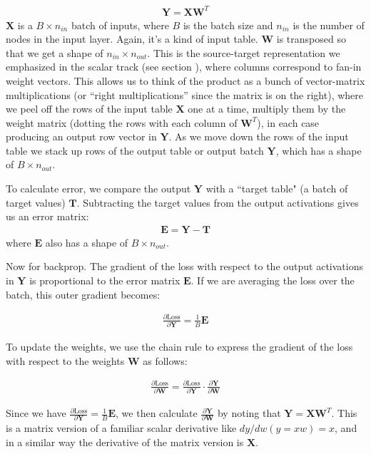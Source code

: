 \begin{eqnarray}
\mathbf{Y} = \mathbf{X} \mathbf{W}^T
\end{eqnarray}
$\mathbf{X}$ is a  $B \times n_{in}$ batch of inputs, where $B$ is the batch size and $n_{in}$ is the number of nodes in the input layer. Again, it's a kind of input table. $\mathbf{W}$ is transposed so that we get a shape of $n_{in} \times n_{out}$. This is the source-target representation we emphasized in the scalar track (see section ), where columns correspond to fan-in weight vectors. This allows us to think of the product as a bunch of vector-matrix multiplications (or ``right multiplications'' since the matrix is on the right), where we peel off the rows of the input table $\mathbf{X}$ one at a time, multiply them by the weight matrix (dotting the rows with each column of $\mathbf{W}^T$), in each case producing an output row vector in $\mathbf{Y}$. As we move down the rows of the input table we stack up rows of the output table or output batch $\mathbf{Y}$, which has a shape of $B \times n_{out}$.

To calculate error, we compare the output $\mathbf{Y}$ with a ``target table" (a batch of target values) $\mathbf{T}$. Subtracting the target values from the output activations gives us an error matrix:
\begin{eqnarray}
\mathbf{E} = \mathbf{Y} - \mathbf{T}
\end{eqnarray}
where $\mathbf{E}$ also has a shape of $B \times n_{out}$.

Now for backprop. The gradient of the loss with respect to the output activations in $\mathbf{Y}$ is proportional to the error matrix $\mathbf{E}$. If we are averaging the loss over the batch, this outer gradient becomes:

\begin{eqnarray}
\frac{\partial \text{Loss}}{\partial \mathbf{Y}} = \frac{1}{B} \mathbf{E}
\end{eqnarray}

To update the weights, we use the chain rule to express the gradient of the loss with respect to the weights $\mathbf{W}$ as follows:

\begin{eqnarray}
\frac{\partial \text{Loss}}{\partial \mathbf{W}} = \frac{\partial \text{Loss}}{\partial \mathbf{Y}} \cdot \frac{\partial \mathbf{Y}}{\partial \mathbf{W}}
\end{eqnarray}

Since we have $\frac{\partial \text{Loss}}{\partial \mathbf{Y}} = \frac{1}{B} \mathbf{E}$, we then calculate $\frac{\partial \mathbf{Y}}{\partial \mathbf{W}}$ by noting that $\mathbf{Y} = \mathbf{X} \mathbf{W}^T$. This is a matrix version of a familiar scalar derivative like $dy/dw(y = xw) = x$, and in a similar way the derivative of the matrix version is $\mathbf{X}$. 

